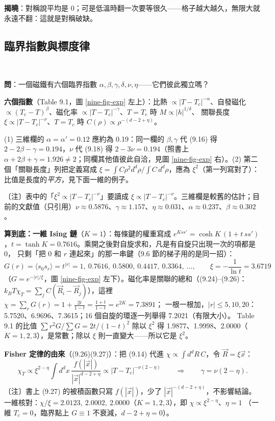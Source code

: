 \textbf{揭曉}：對稱說平均是 0；可是低溫時翻一次要等很久——格子越大越久，無限大就永遠不翻：這就是對稱破缺。

\subsection{臨界指數與標度律}
\leavevmode{}\ \par\nopagebreak

\textbf{問}：一個磁鐵有六個臨界指數 $\alpha,\beta,\gamma,\delta,\nu,\eta$——它們彼此獨立嗎？

\textbf{六個指數}（Table 9.1，圖 \ref{nine-fig-exp} 左上）：比熱 $\propto|T-T_c|^{-\alpha}$、自發磁化 $\propto(T_c-T)^\beta$、磁化率 $\propto|T-T_c|^{-\gamma}$、$T=T_c$ 時 $M\propto|h|^{1/\delta}$、
關聯長度 $\xi\propto|T-T_c|^{-\nu}$、$T=T_c$ 時 $C(\rho)\propto\rho^{-(d-2+\eta)}$。
\begin{errbox}[p.~210，Table 9.1]
(1) 三維欄的 $\alpha=\alpha'=0.12$ 應約為 0.19：同一欄的 $\beta,\gamma$ 代 (9.16) 得 $2-2\beta-\gamma=0.194$，$\nu$ 代 (9.18) 得 $2-3\nu=0.194$（照書上 $\alpha+2\beta+\gamma=1.926\ne2$；同欄其他值彼此自洽，見圖 \ref{nine-fig-exp} 右）。(2) 第二個「關聯長度」列把定義寫成 $\xi=\int C\rho^2d^d\rho/\!\int C\,d^d\rho$，應為 $\xi^2$（第一列寫對了）：比值是長度的\emph{平方}，見下面一維的例子。
\end{errbox}
〔注〕表中的「$\xi^2\propto|T-T_c|^{-\nu}$」要讀成 $\xi\propto|T-T_c|^{-\nu}$。三維欄是較舊的估計；目前的文獻值（只引用）$\nu\approx0.5876$、$\gamma\approx1.157$、$\eta\approx0.031$、$\alpha\approx0.237$、$\beta\approx0.302$。

\textbf{算到底：一維 Ising 鏈}（$K=1$）：每條鍵的權重寫成 $e^{Kss'}=\cosh K\,(1+t\,ss')$，$t=\tanh K=0.7616$。乘開之後對自旋求和，凡是有自旋只出現一次的項都是 0，
只剩「把 0 和 $r$ 連起來」的那一串鍵（9.6 節的梯子用的是同一招）：
\[G(r)=\langle s_0s_r\rangle=t^{|r|}=1,\ 0.7616,\ 0.5800,\ 0.4417,\ 0.3364,\ \dots,\qquad\xi=-\frac1{\ln t}=3.6719\]
（$G=e^{-|r|/\xi}$，圖 \ref{nine-fig-exp} 左下）。磁化率是關聯的總和（(9.24)--(9.26)：$k_BT\chi_T=\sum_jC(\vec R_i-\vec R_j)$），這裡 $\chi=\sum_rG(r)=1+\frac{2t}{1-t}=\frac{1+t}{1-t}=e^{2K}=7.3891$；
一根一根加，$|r|\le5,10,20$：5.7520、6.9696、7.3615；16 個自旋的環逐一列舉得 7.2021（有限大小）。
Table 9.1 的比值 $\sum r^2G/\sum G=2t/(1-t)^2$ 除以 $\xi^2$ 得 1.9877、1.9998、2.0000（$K=1,2,3$），是常數；除以 $\xi$ 則一直變大——所以它是 $\xi^2$。

\textbf{Fisher 定律的由來}（(9.26)(9.27)）：把 (9.14) 代進 $\chi\propto\int d^dR\,C$，令 $\vec R=\xi\vec x$：
\[\chi_T\propto\xi^{2-\eta}\int d^dx\,\frac{f(|\vec x|)}{|\vec x|^{d-2+\eta}}\propto|T-T_c|^{-\nu(2-\eta)}\qquad\Rightarrow\qquad\gamma=\nu(2-\eta).\tag{9.27}\]
〔注〕書上 (9.27) 的被積函數只寫 $f(|\vec x|)$，少了 $|\vec x|^{-(d-2+\eta)}$，不影響結論。一維核對：$\chi/\xi=2.0123,\ 2.0002,\ 2.0000$（$K=1,2,3$），即 $\chi\propto\xi^{2-\eta}$、$\eta=1$
（一維 $T_c=0$，臨界點上 $G\equiv1$ 不衰減，$d-2+\eta=0$）。

